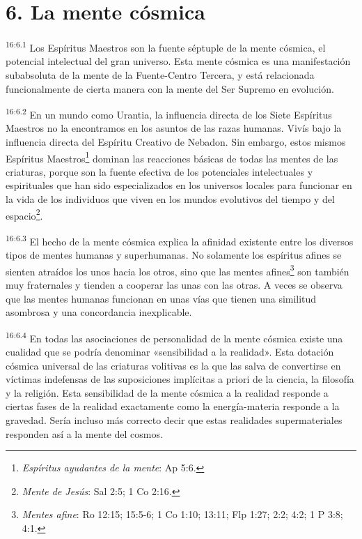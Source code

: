 \section*{6. La mente cósmica}
\par
\textsuperscript{16:6.1} Los Espíritus Maestros son la fuente séptuple de la mente cósmica, el potencial intelectual del gran universo. Esta mente cósmica es una manifestación subabsoluta de la mente de la Fuente-Centro Tercera, y está relacionada funcionalmente de cierta manera con la mente del Ser Supremo en evolución.

\par
\textsuperscript{16:6.2} En un mundo como Urantia, la influencia directa de los Siete Espíritus Maestros no la encontramos en los asuntos de las razas humanas. Vivís bajo la influencia directa del Espíritu Creativo de Nebadon. Sin embargo, estos mismos Espíritus Maestros\footnote{\textit{Espíritus ayudantes de la mente}: Ap 5:6.} dominan las reacciones básicas de todas las mentes de las criaturas, porque son la fuente efectiva de los potenciales intelectuales y espirituales que han sido especializados en los universos locales para funcionar en la vida de los individuos que viven en los mundos evolutivos del tiempo y del espacio\footnote{\textit{Mente de Jesús}: Sal 2:5; 1 Co 2:16.}.

\par
\textsuperscript{16:6.3} El hecho de la mente cósmica explica la afinidad existente entre los diversos tipos de mentes humanas y superhumanas. No solamente los espíritus afines se sienten atraídos los unos hacia los otros, sino que las mentes afines\footnote{\textit{Mentes afine}: Ro 12:15; 15:5-6; 1 Co 1:10; 13:11; Flp 1:27; 2:2; 4:2; 1 P 3:8; 4:1.} son también muy fraternales y tienden a cooperar las unas con las otras. A veces se observa que las mentes humanas funcionan en unas vías que tienen una similitud asombrosa y una concordancia inexplicable.

\par
\textsuperscript{16:6.4} En todas las asociaciones de personalidad de la mente cósmica existe una cualidad que se podría denominar «sensibilidad a la realidad». Esta dotación cósmica universal de las criaturas volitivas es la que las salva de convertirse en víctimas indefensas de las suposiciones implícitas a priori de la ciencia, la filosofía y la religión. Esta sensibilidad de la mente cósmica a la realidad responde a ciertas fases de la realidad exactamente como la energía-materia responde a la gravedad. Sería incluso más correcto decir que estas realidades supermateriales responden así a la mente del cosmos.

